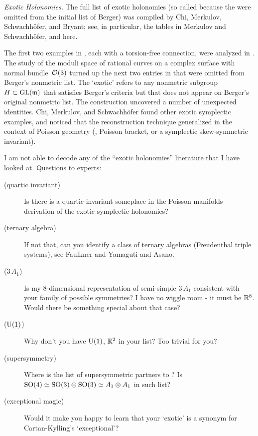 {\it Exotic Holonomies.}
The full list of exotic holonomies (so called because the were omitted from
the initial list of Berger) was compiled by Chi, Merkulov,
Schwachh\"ofer, and Bryant; see, in
particular, the tables in Merkulov and
Schwachh{\"o}fer, and  here.

The first two examples in , each with a torsion-free
connection, were analyzed in . The
study of the moduli space of rational curves on a
complex surface with normal bundle~${\cal O}(3)$ turned up the next two
entries in  that were omitted from Berger's nonmetric
list. The `exotic' refers to any nonmetric
subgroup~$H\subset{\rm GL}({\mathfrak m})$ that satisfies Berger's criteria but
that does not appear on Berger's original nonmetric list.
The construction  uncovered a number of unexpected identities.
Chi, Merkulov, and Schwachh\"ofer found other exotic symplectic
examples, and noticed that the reconstruction technique generalized in the
context of Poisson geometry (\ie, Poisson bracket, or a symplectic
skew-symmetric invariant).


\bigskip

I am not able to decode any of the ``exotic holonomies'' literature that I
have looked at. Questions to experts:

\begin{description}
  \item[(quartic invariant)]
Is there is a quartic invariant someplace in the Poisson manifolds derivation
of the exotic symplectic holonomies?
  \item[(ternary algebra)]
If not that, can you identify a class of ternary algebras (Freudenthal triple
systems), see Faulkner and Yamaguti and
Asano.
  \item[($3\,A_1$)]
Is my 8-dimensional representation of semi-simple $3\,A_1$ consistent with your
family of possible symmetries? I have no wiggle room - it must be $\mathbb{R}^{8}$.
Would there be something special about that case?
  \item[(${\rm U}(1)$)]
Why don't you have ${\rm U}(1)  $, $\mathbb{R}^{2}$ in your list?
Too trivial for you?
  \item[(supersymmetry)]
Where is the list of supersymmetric partners to
?
Is
\(\textrm{SO}(4) \simeq \textrm{SO}(3)\oplus\textrm{SO}(3) \simeq A_1\oplus A_1
\)
in such list?
  \item[(exceptional magic)] Would it make you happy to learn that
your `exotic' is a synonym for Cartan-Kylling's `exceptional'?

\end{description}

